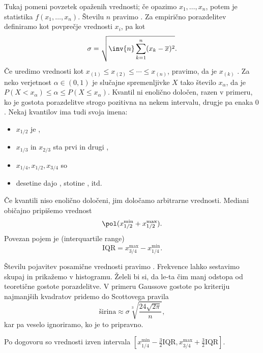 
Tukaj  pomeni povzetek opaženih vrednosti; če opazimo $x_1,
\ldots, x_n$, potem je statistika $f(x_1, \ldots, x_n)$.
Številu $n$ pravimo .
Za empirično porazdelitev definiramo  kot povprečje
vrednosti $x_i$,  pa kot
\[
  \sigma = \sqrt{\inv{n} \sum_{k=1}^n (x_k - \overline{x})^2 }.
\]
Če uredimo vrednosti kot $x_{(1)} \le x_{(2)} \le \cdots \le x_{(n)}$, pravimo,
da je $x_{(k)}$ .
Za neko verjetnost $\alpha \in (0,1)$ je  slučajne spremenljivke
$X$ tako število $x_\alpha$, da je $P(X < x_\alpha) \le \alpha \le P(X \le
x_\alpha)$.
Kvantil ni enolično določen, razen v primeru, ko je gostota porazdelitve strogo
pozitivna na nekem intervalu, drugje pa enaka $0$.
Nekaj kvantilov ima tudi svoja imena:
\begin{itemize}
\item $x_{1/2}$ je ,
\item $x_{1/3}$ in $x_{2/3}$ sta prvi in drugi ,
\item $x_{1/4}, x_{1/2}, x_{3/4}$ so 
\item desetine dajo , stotine , itd.
\end{itemize}
Če kvantili niso enolično določeni, jim določamo arbitrarne vrednosti.
Mediani običajno pripišemo vrednost
\[
  \pol (x_{1/2}^{\text{min}} + x_{1/2}^{\text{max}}).
\]
Povezan pojem je  (interquartile range)
\[
  \text{IQR} = x_{3/4}^{\text{max}} - x_{1/4}^{\text{min}}.
\]


Številu pojavitev posamične vrednosti pravimo .
Frekvence lahko sestavimo skupaj in prikažemo v histogramu.
Želeli bi si, da le-ta čim manj odstopa od teoretične gostote porazdelitve.
V primeru Gaussove gostote po kriteriju najmanjših kvadratov pridemo do
Scottovega pravila
\[
  \text{širina} \approx \sigma \sqrt[3]{\frac{24 \sqrt{2 \pi}}{n}},
\]
kar pa veselo ignoriramo, ko je to pripravno.


Po dogovoru so  vrednosti izven intervala $[x_{1/4}^{\text{min}}
- \frac{3}{2} \text{IQR}, x_{3/4}^{\text{max}} + \frac{3}{2} \text{IQR}]$.


